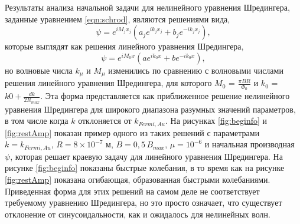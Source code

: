 \documentclass[A4,12pt,oneside]{article}
\renewcommand{\(}{\left(}
\renewcommand{\)}{\right)}
\begin{document}
Результаты анализа начальной задачи для нелинейного уравнения Шредингера, заданные уравнением \ref{eqn:schrod}, являются решениями вида,
\begin{equation}
\psi = e^{i M_j x_j} \left( a_j e^{i k_j x_j} + b_j e^{- i k_j x_j} \right),
\end{equation}
которые выглядят как решения линейного уравнения Шредингера,
\begin{equation}
\psi = e^{i M_0 x} \left( a e^{i k_0 x} + b e^{- i k_0 x} \right),
\end{equation}
но волновые числа $k_{\mu}$ и $M_{\mu}$ изменились по сравнению с волновыми числами решения линейного уравнения Шредингера, для которого $M_{0}$ = $\frac{\pi BR}{\Phi_0}$ и $k_{0}$ = $k0 + \frac{dk}{2 R_{max} }$. Эта форма представляется как приближенное решение нелинейного уравнения Шредингера для широкого диапазона разумных значений параметров, в том числе когда $k$ отклоняется от $k_ {Fermi, Au}$. 
На рисунках \ref{fig:beginfo} и \ref{fig:restAmp} показан пример одного из таких решений с параметрами $k = k_{Fermi, Au}$, $R = 8 \times 10^{-7}$ м, $B = 0,5 \, B_{max}$, $\mu = 10^{-6}$ и начальная производная $\psi$, которая решает краевую задачу для линейного уравнения Шредингера. На рисунке \ref{fig:beginfo} показаны быстрые колебания, в то время как на рисунке \ref{fig:restAmp} показана огибающая, образованная быстрыми колебаниями. Приведенная форма для этих решений на самом деле не соответствует требуемому уравнению Шредингера, но это просто означает, что существует отклонение от синусоидальности, как и ожидалось для нелинейных волн.
\end{document}
